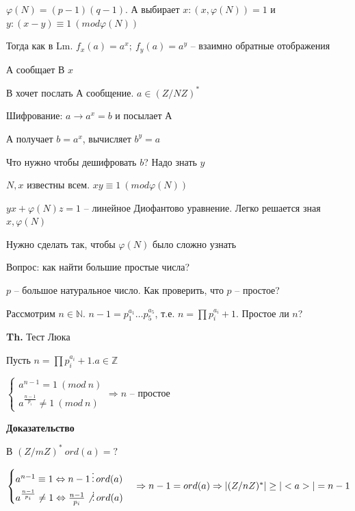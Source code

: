 \documentclass[14pt, letter paper]{article}
\begin{document}
$\varphi(N) = (p-1)(q-1)$. А выбирает $x : (x, \varphi(N)) = 1$ и $y : (x - y) \equiv 1\ (mod \varphi(N))$

Тогда как в Lm. $f_x(a) = a^x;\ f_y(a) = a^y$ -- взаимно обратные отображения

А сообщает В $x$

В хочет послать А сообщение. $a \in (Z/NZ)^*$

Шифрование: $a \rightarrow a^x = b$ и посылает А

А получает $b = a^x$, вычисляет $b^y = a$

\vspace{5mm}

Что нужно чтобы дешифровать $b$? Надо знать $y$

$N, x$ известны всем. $xy \equiv 1\ (mod \varphi(N))$

$yx + \varphi(N)z = 1$ -- линейное Диофантово уравнение. Легко решается зная $x, \varphi(N)$

Нужно сделать так, чтобы $\varphi(N)$ было сложно узнать

\vspace{5mm}

Вопрос: как найти большие простые числа?

$p$ -- большое натуральное число. Как проверить, что $p$ -- простое?

Рассмотрим $n \in \mathbb{N}$. $n - 1 = p_1^{a_1} \ldots p_5^{a_5}$, т.е. $n = \prod p_i^{a_i} + 1$. Простое ли $n$?

\vspace{5mm}

\textbf{Th.} Тест Люка

Пусть $n = \prod p_i^{a_i} + 1. a \in \mathbb{Z}$

$\begin{cases}
    a^{n-1} = 1\ (mod\ n)\\
    a^\frac{n-1}{p_i} \neq 1\ (mod\ n)
\end{cases} \Rightarrow n$ -- простое

\begin{center}
    \textbf{Доказательство}
\end{center}

В $(Z/mZ)^*\ ord(a) = ?$

$\begin{cases}
    a^{n-1} \equiv 1 \Leftrightarrow n - 1 \, \vdots \, ord(a) \\
    a^\frac{n-1}{p_i} \neq 1 \Leftrightarrow \frac{n-1}{p_i} \not\, \vdots \, ord(a)
\end{cases} \Rightarrow n - 1 = ord(a) \Rightarrow |(Z/nZ)^*| \geq |<a>| = n - 1$
\end{document}
